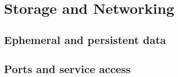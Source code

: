 \chapter{Storage and Networking}
\label{chap:storage-networking}

\section{Ephemeral and persistent data}

\section{Ports and service access}

